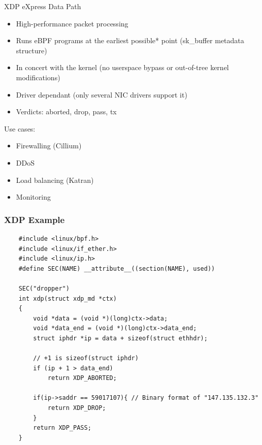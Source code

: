 \documentclass{beamer}
\begin{document}
\begin{frame}{XDP}
  eXpress Data Path
  \begin{itemize}
    \item High-performance packet processing
    \item Runs eBPF programs at the earliest possible* point (sk\_buffer metadata structure)
    \item In concert with the kernel (no userspace bypass or out-of-tree kernel modifications)
    \item Driver dependant (only several NIC drivers support it)
    \item Verdicts: aborted, drop, pass, tx
  \end{itemize}

  Use cases:
  \begin{itemize}
    \item Firewalling (Cillium\footnotemark[1])
    \item DDoS
    \item Load balancing (Katran\footnotemark[2])
    \item Monitoring
  \end{itemize}
\end{frame}

\begin{frame}[fragile]
  \frametitle{XDP Example}
  \begin{verbatim}
    #include <linux/bpf.h>
    #include <linux/if_ether.h>
    #include <linux/ip.h>
    #define SEC(NAME) __attribute__((section(NAME), used))

    SEC("dropper")
    int xdp(struct xdp_md *ctx)
    {
        void *data = (void *)(long)ctx->data;
        void *data_end = (void *)(long)ctx->data_end;
        struct iphdr *ip = data + sizeof(struct ethhdr);

        // +1 is sizeof(struct iphdr)
        if (ip + 1 > data_end)
            return XDP_ABORTED;

        if(ip->saddr == 59017107){ // Binary format of "147.135.132.3"
            return XDP_DROP;
        }
        return XDP_PASS;
    }
  \end{verbatim}
\end{frame}
\end{document}
